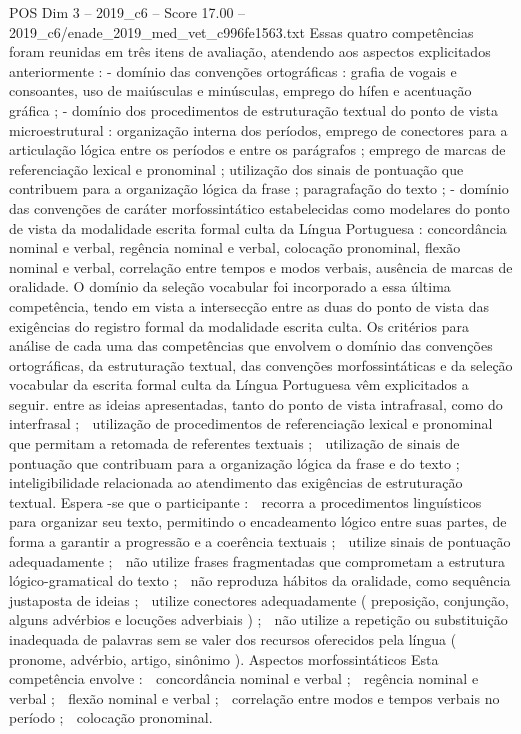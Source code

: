 \begin{textsample}{POS Dim 3 – 2019\_c6 – Score 17.00 – 2019\_c6/enade\_2019\_med\_vet\_c996fe1563.txt}
Essas quatro competências foram reunidas em três itens de avaliação, atendendo aos aspectos explicitados anteriormente : - domínio das convenções ortográficas : grafia de vogais e consoantes, uso de maiúsculas e minúsculas, emprego do hífen e acentuação gráfica ; - domínio dos procedimentos de estruturação textual do ponto de vista microestrutural : organização interna dos períodos, emprego de conectores para a articulação lógica entre os períodos e entre os parágrafos ; emprego de marcas de referenciação lexical e pronominal ; utilização dos sinais de pontuação que contribuem para a organização lógica da frase ; paragrafação do texto ; - domínio das convenções de caráter morfossintático estabelecidas como modelares do ponto de vista da modalidade escrita formal culta da Língua Portuguesa : concordância nominal e verbal, regência nominal e verbal, colocação pronominal, flexão nominal e verbal, correlação entre tempos e modos verbais, ausência de marcas de oralidade.
O domínio da seleção vocabular foi incorporado a essa última competência, tendo em vista a intersecção entre as duas do ponto de vista das exigências do registro formal da modalidade escrita culta.
Os critérios para análise de cada uma das competências que envolvem o domínio das convenções ortográficas, da estruturação textual, das convenções morfossintáticas e da seleção vocabular da escrita formal culta da Língua Portuguesa vêm explicitados a seguir. entre as ideias apresentadas, tanto do ponto de vista intrafrasal, como do interfrasal ;  utilização de procedimentos de referenciação lexical e pronominal que permitam a retomada de referentes textuais ;  utilização de sinais de pontuação que contribuam para a organização lógica da frase e do texto ;  inteligibilidade relacionada ao atendimento das exigências de estruturação textual.
Espera -se que o participante :  recorra a procedimentos linguísticos para organizar seu texto, permitindo o encadeamento lógico entre suas partes, de forma a garantir a progressão e a coerência textuais ;  utilize sinais de pontuação adequadamente ;  não utilize frases fragmentadas que comprometam a estrutura lógico-gramatical do texto ;  não reproduza hábitos da oralidade, como sequência justaposta de ideias ;  utilize conectores adequadamente ( preposição, conjunção, alguns advérbios e locuções adverbiais ) ;  não utilize a repetição ou substituição inadequada de palavras sem se valer dos recursos oferecidos pela língua ( pronome, advérbio, artigo, sinônimo ).
Aspectos morfossintáticos Esta competência envolve :  concordância nominal e verbal ;  regência nominal e verbal ;  flexão nominal e verbal ;  correlação entre modos e tempos verbais no período ;  colocação pronominal.

\end{textsample}
